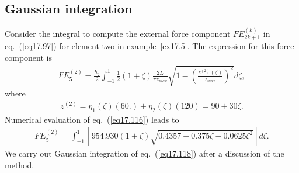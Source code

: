 \documentclass{AeroStructure-ERJohnson}
\begin{document}
{\def\thefigure{17.21}
}


\subsection{Gaussian integration}\label{sec17.3.6}

Consider the integral to compute the external force component $F E_{2k+1}^{(k)}$ in eq.~(\ref{eq17.97}) for element two in example~\ref{ex17.5}. The expression for this force component is
\begin{align}\label{eq17.116}
F E_{5}^{(2)}=\frac{h_{2}}{2} \int_{-1}^{1} \frac{1}{2}(1+\zeta) \frac{2 L}{\pi z_{max }} \sqrt{1-\left(\frac{z^{(2)}(\zeta)}{z_{max }}\right)^{2}} d \zeta,
\end{align}
where
\begin{align}\label{eq17.117}
z^{(2)}=\eta_{1}(\zeta)(60 .)+\eta_{2}(\zeta)(120)=90+30 \zeta.
\end{align}
Numerical evaluation of eq.~(\ref{eq17.116}) leads to
\begin{align}\label{eq17.118}
F E_{5}^{(2)}=\int_{-1}^{1}\left[954.930(1+\zeta) \sqrt{0.4357-0.375 \zeta-0.0625 \zeta^{2}}\right] d \zeta.
\end{align}
We carry out Gaussian integration of eq.~(\ref{eq17.118}) after a discussion of the method.
\end{document}
